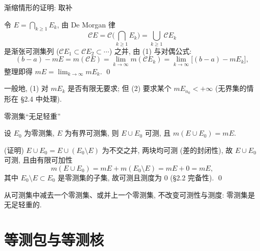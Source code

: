 
\begin{frame}{渐缩情形的证明: 取补}

令 $E = \bigcap_{k \geqslant 1} E_k$, 由 De Morgan 律
\[
\mathscr{C}E = \mathscr{C}\Big(\bigcap_{k \geqslant 1} E_k\Big) = \bigcup_{k \geqslant 1} \mathscr{C}E_k
\]
是\alert{渐张}可测集列 ($\mathscr{C}E_1 \subset \mathscr{C}E_2 \subset \cdots$) 之并, 由 (1) 与对偶公式:
\[
(b-a) - mE = m(\mathscr{C}E) = \lim_{k \to \infty} m(\mathscr{C}E_k)
= \lim_{k \to \infty} \big[(b - a) - mE_k\big],
\]
整理即得 $mE = \lim_{k \to \infty} mE_k$.
\qed

\pause

\begin{remark}
一般地, (1) 对 $m E_k$ 是否有限\alert{无要求}; 但 (2) 要求\alert{某个} $m E_{n_0} < +\infty$ (无界集的情形在 §2.4 中处理).
\end{remark}

\end{frame}


\begin{frame}{零测集``无足轻重''}

\begin{prop}
设 $E_0$ 为零测集, $E$ 为有界可测集, 则 $E \cup E_0$ 可测, 且 $m(E \cup E_0) = mE$.
\end{prop}

\pause

\startproof[bg=yellow, fg=red](证明)
$E \cup E_0 = E \cup (E_0 \setminus E)$ 为\alert{不交}之并, 两块均可测 (差的封闭性), 故 $E \cup E_0$ 可测, 且由有限可加性
\[
m(E \cup E_0) = mE + m(E_0 \setminus E) = mE + 0 = mE ,
\]
其中 $E_0 \setminus E \subset E_0$ 是零测集的子集, 故可测且测度为 $0$ (§2.2 完备性).
\qed

\pause

\begin{attnblock}
从可测集中减去一个零测集、或并上一个零测集, 不改变可测性与测度: \alert{零测集是无足轻重的}.
\end{attnblock}

\end{frame}


\section[等测包]{等测包与等测核}

